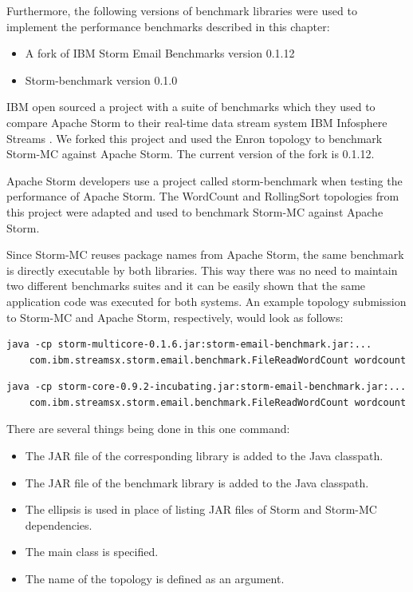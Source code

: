 \documentclass[bsc,deptreport,twoside,singlespacing,normalheadings,parskip]{infthesis}\usepackage[]{graphicx}\usepackage[]{color}
\begin{document}
Furthermore, the following versions of benchmark libraries were used to implement the performance benchmarks described in this chapter:

\begin{itemize}
	\item A fork of IBM Storm Email Benchmarks version 0.1.12
	\item Storm-benchmark version 0.1.0
\end{itemize}

IBM open sourced a project with a suite of benchmarks which they used to compare Apache Storm to their real-time data stream system IBM Infosphere Streams \citep{InfoSphereStreams}. We forked this project and used the Enron topology to benchmark Storm-MC against Apache Storm. The current version of the fork is 0.1.12.

Apache Storm developers use a project called storm-benchmark when testing the performance of Apache Storm. The WordCount and RollingSort topologies from this project were adapted and used to benchmark Storm-MC against Apache Storm. 

Since Storm-MC reuses package names from Apache Storm, the same benchmark is directly executable by both libraries. This way there was no need to maintain two different benchmarks suites and it can be easily shown that the same application code was executed for both systems. An example topology submission to Storm-MC and Apache Storm, respectively, would look as follows:

\begin{verbatim}
java -cp storm-multicore-0.1.6.jar:storm-email-benchmark.jar:...
    com.ibm.streamsx.storm.email.benchmark.FileReadWordCount wordcount
\end{verbatim}
\begin{verbatim}
java -cp storm-core-0.9.2-incubating.jar:storm-email-benchmark.jar:...
    com.ibm.streamsx.storm.email.benchmark.FileReadWordCount wordcount
\end{verbatim}

There are several things being done in this one command:

\begin{itemize}
	\item The JAR file of the corresponding library is added to the Java classpath.
	\item The JAR file of the benchmark library is added to the Java classpath.
	\item The ellipsis is used in place of listing JAR files of Storm and Storm-MC dependencies.
	\item The main class is specified.
	\item The name of the topology is defined as an argument.
\end{itemize}
\end{document}
